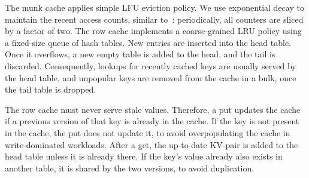The munk cache applies simple LFU eviction policy. %
We use exponential decay to maintain the recent access counts, similar to~\cite{tinyLFU}: periodically, all counters are 
sliced by a factor of two. 
The row cache implements a coarse-grained LRU policy using a fixed-size queue of hash tables. 
New entries are inserted into the head table. Once it overflows, a new empty table is added to the head,
and the tail is discarded. Consequently, lookups for recently cached keys are usually served by the head 
table, and unpopular keys are removed from the cache in a bulk, once the tail table is dropped.

The row cache must never serve stale values. %
Therefore, a put updates the cache  if a previous version of that key is already in the cache. 
If the key is not present in the cache, the put does not update it, to avoid overpopulating the cache 
in write-dominated workloads. After a get, the up-to-date KV-pair is added to the head table unless it is already there.
If the key's value already also exists in another table, it is shared by the two versions, to avoid duplication.

